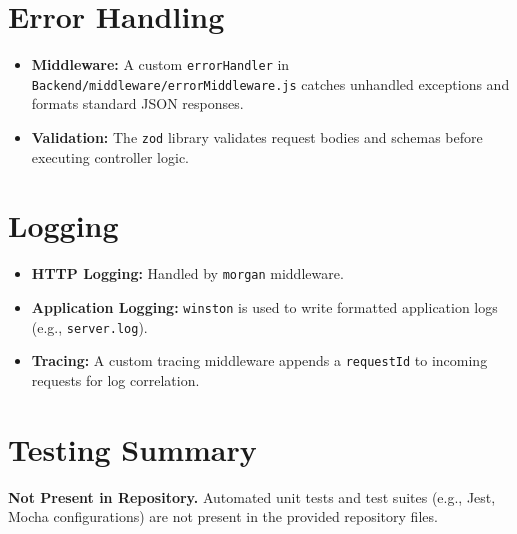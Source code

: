 \documentclass[11pt,a4paper]{article}
\begin{document}
\section{Error Handling}
\begin{itemize}[leftmargin=*]
    \item \textbf{Middleware:} A custom \texttt{errorHandler} in
          \texttt{Backend/middleware/errorMiddleware.js} catches unhandled
          exceptions and formats standard JSON responses.
    \item \textbf{Validation:} The \texttt{zod} library validates request
          bodies and schemas before executing controller logic.
\end{itemize}

\section{Logging}
\begin{itemize}[leftmargin=*]
    \item \textbf{HTTP Logging:} Handled by \texttt{morgan} middleware.
    \item \textbf{Application Logging:} \texttt{winston} is used to write
          formatted application logs (e.g., \texttt{server.log}).
    \item \textbf{Tracing:} A custom tracing middleware appends a
          \texttt{requestId} to incoming requests for log correlation.
\end{itemize}

\section{Testing Summary}
\textbf{Not Present in Repository.} Automated unit tests and test suites
(e.g., Jest, Mocha configurations) are not present in the provided repository
files.

\end{document}
